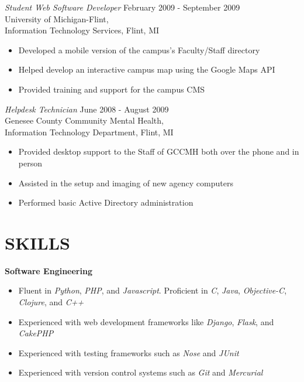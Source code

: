 \documentclass[line,margin]{res}
\begin{document}
\begin{resume}
{\sl Student Web Software Developer } \hfill February 2009 - September 2009 \\
        University of Michigan-Flint, \\
        Information Technology Services, Flint, MI
        \vspace{2 mm}
        \begin{itemize}
        \item Developed a mobile version of the campus's Faculty/Staff
        directory
        \item Helped develop an interactive campus map using the
        Google Maps API
        \item Provided training and support for the campus CMS
        \end{itemize}

{\sl Helpdesk Technician} \hfill June 2008 - August 2009 \\
        Genesee County Community Mental Health, \\
        Information Technology Department, Flint, MI
        \vspace{2 mm}
        \begin{itemize}
        \item Provided desktop support to the Staff of GCCMH both
        over the phone and in person
        \item Assisted in the setup and imaging of new agency
        computers
        \item Performed basic Active Directory administration
        \end{itemize}

        \section{SKILLS}
        \textbf{Software Engineering}
        \vspace{2 mm}
        \begin{itemize}
        \item Fluent in {\sl Python}, {\sl PHP}, and {\sl Javascript}. Proficient
        in {\sl C}, {\sl Java}, {\sl Objective-C}, {\sl Clojure}, and {\sl C++}
        \item Experienced with web development frameworks like {\sl Django},
{\sl Flask}, and {\sl CakePHP}
\item Experienced with testing frameworks such as {\sl Nose} and {\sl JUnit}
\item Experienced with version control systems such as {\sl Git} and {\sl Mercurial}
\end{itemize}


\end{resume}
\end{document}
